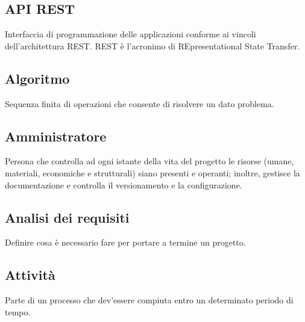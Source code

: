 \documentclass[../glossario.tex]{subfiles}
\begin{document}
\subsection*{API REST}
Interfaccia di programmazione delle applicazioni conforme ai vincoli dell'architettura REST. REST è l'acronimo di REpresentational State Transfer.

\subsection*{Algoritmo}
Sequenza finita di operazioni che consente di risolvere un dato problema.

\subsection*{Amministratore}
Persona che controlla ad ogni istante della vita del progetto le risorse (umane, materiali, economiche e strutturali) siano presenti e operanti; inoltre, gestisce la documentazione e controlla il versionamento e la configurazione.

\subsection*{Analisi dei requisiti}
Definire cosa è necessario fare per portare a termine un progetto.

\subsection*{Attività}
Parte di un processo che dev'essere compiuta entro un determinato periodo di tempo.
\end{document}
